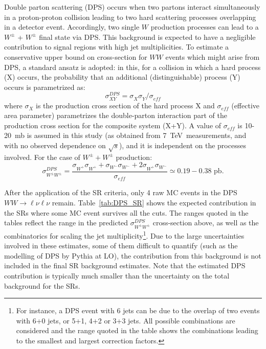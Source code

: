 Double parton scattering (DPS) occurs when two partons interact simultaneously in a proton-proton collision leading to two hard scattering 
processes overlapping in a detector event. 
Accordingly, two single $W$ production processes can lead to a $W^\pm$ + $W^\pm$ final state via DPS. 
This background is expected to have a negligible contribution to signal regions with high jet multiplicities.
To estimate a conservative upper bound on cross-section for $WW$ events which might arise from DPS, a standard ansatz is adopted: 
in this, for a collision in which a hard process (X) occurs, the probability that 
an additional (distinguishable) process (Y) occurs is parametrized as:
\begin{equation}
\sigma^{DPS}_{XY} = \sigma^{}_{X}\sigma^{}_{Y}/\sigma^{}_{eff}
\end{equation} 
where $\sigma^{}_{X}$ is the production cross section of the hard 
process X and $\sigma^{}_{eff}$ (effective area parameter) 
parametrizes the double-parton interaction part of the production 
cross section for the composite system (X+Y). 
A value of $\sigma^{}_{eff}$ is 10-20~mb is assumed in this study (as obtained from 7~TeV~measurements, and with no observed dependence on $\sqrt{s}$), and it is independent on the processes involved. For the case of $W^\pm+W^\pm$ production:
\begin{equation}
\sigma^{DPS}_{W^\pm W^\pm} = \frac{ \sigma^{}_{W^+}\sigma^{}_{W^+} + \sigma^{}_{W^-}\sigma^{}_{W^-} + 2\sigma^{}_{W^+}\sigma^{}_{W^-}}{\sigma^{}_{eff} } \simeq 0.19-0.38\text{ pb.}
\end{equation} 

After the application of the SR criteria, only 4 raw MC events in the DPS $WW\to\ell\nu\ell\nu$ remain. 
Table~\ref{tab:DPS_SR} shows the expected contribution in the SRs where some MC event survives all the cuts. The ranges quoted in the tables reflect the range in the predicted $\sigma^{DPS}_{W^\pm W^\pm}$ cross-section above, as well as the combinatorics for scaling the jet multiplicity\footnote{For instance, a DPS event with 6 jets can be due to the overlap of two events with 6+0 jets, or 5+1, 4+2 or 3+3 jets. All possible combinations are considered and the range quoted in the table shows the combinations leading to the smallest and largest correction factors.}.
Due to the large uncertainties involved in these estimates, some of them difficult to quantify (such as the modelling of DPS by {\sc Pythia} at LO), the contribution from this background is not included in the final SR background estimates. 
Note that the estimated DPS contribution is typically much smaller than the uncertainty on the total background for the SRs.

